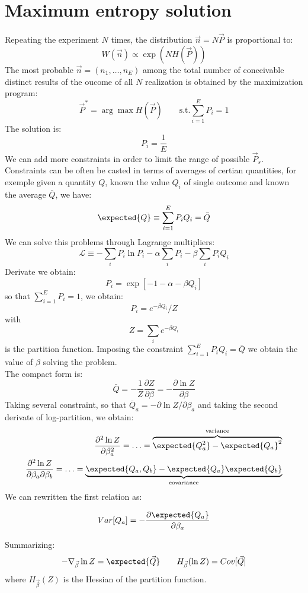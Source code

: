 \section{Maximum entropy solution}
Repeating the experiment $N$ times, the distribution $\vec{n} = N\vec{P}$ is proportional to:
\[
W(\vec{n}) \propto \exp(NH(\vec{P}))
\]
The most probable $\vec{n} = (n_1,\ldots,n_E)$ among the total number of conceivable distinct results of the oucome of all $N$ realization is obtained by the maximization program:
\[
\vec{P}^* = \arg\max H(\vec{P}) \qquad \text{s.t.} \sum_{i=1}^{E}P_i = 1
\]
The solution is:
\[
P_i = \frac{1}{E}
\]
We can add more constraints in order to limit the range of possible $\vec{P}_s$. Constraints can be often be casted in terms of averages of certian quantities, for exemple given a quantity $Q$, known the value $Q_i$ of single outcome and known the average $\bar{Q}$, we have:
\[
\expected{Q} \equiv \sum_{i=1}^{E} P_i Q_i = \bar{Q}
\]
We can solve this problems through Lagrange multipliers:
\[
\mathcal{L} \equiv - \sum_i P_i \ln P_i - \alpha \sum_i P_i - \beta \sum_i P_iQ_i
\]
Derivate we obtain:
\[
P_i = \exp [-1-\alpha -\beta Q_i]
\]
so that $\sum_{i=1}^{E} P_i =1$, we obtain:
\[
P_i = e^{-\beta Q_i}/Z
\]
with
\[
Z = \sum_i e^{-\beta Q_i}
\]
is the partition function. Imposing the constraint $\sum_{i=1}^E P_iQ_i = \bar{Q}$ we obtain the value of $\beta$ solving the problem.\\
The compact form is:
\[
\bar{Q} = - \frac{1}{Z} \frac{\partial Z}{\partial \beta} = - \frac{\partial \ln Z}{\partial \beta}
\]
Taking several constraint, so that $\bar{Q}_a = -\partial \ln Z/ \partial \beta_a$ and taking the second derivate of log-partition, we obtain:
\begin{align*}
\frac{\partial^2 \ln Z}{\partial \beta_a^2} = \ldots = \overbrace{\expected{Q_a^2} - \expected{Q_a}^2}^{\text{variance}}\\
\frac{\partial^2 \ln Z}{\partial \beta_a \partial \beta_b} = \ldots = \underbrace{\expected{Q_a,Q_b} - \expected{Q_a}\expected{Q_b}}_{\text{covariance}}
\end{align*}
We can rewritten the first relation as:
\begin{mytheorem}
\[
Var[Q_a] = -\frac{\partial \expected{Q_a}}{\partial \beta_a}
\]
\end{mytheorem}
Summarizing:
\[
-\nabla_{\vec{\beta}}\ln Z = \expected{\vec{Q}} \qquad H_{\vec{\beta}}(\ln Z) = Cov[\vec{Q}]
\]
where $H_{\vec{\beta}}(Z)$ is the Hessian of the partition function.
